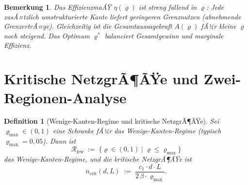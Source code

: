 ﻿\documentclass[12pt, a4paper, openany]{report}
\newtheorem{definition}[theorem]{Definition}
\newtheorem{remark}[theorem]{Bemerkung}
\newcommand{\calR}{\mathcal{R}}
\begin{document}
\begin{remark}
Das EffizienzmaÃŸ $\eta(\varrho)$ ist streng fallend in $\varrho$: Jede
zusÃ¤tzlich umstrukturierte Kante liefert geringeren Grenznutzen (abnehmende
GrenzertrÃ¤ge).  Gleichzeitig ist die Gesamtaussagekraft $A(\varrho)$ fÃ¼r
kleine $\varrho$ noch steigend.  Das Optimum $\varrho^*$ balanciert
Gesamtgewinn und marginale Effizienz.
\end{remark}

\section{Kritische NetzgrÃ¶ÃŸe und Zwei-Regionen-Analyse}
\label{sec:scaling_crit}

\begin{definition}[Wenige-Kanten-Regime und kritische NetzgrÃ¶ÃŸe]
\label{def:few_edges}
Sei $\varrho_{\max} \in (0, 1)$ eine Schranke fÃ¼r das
Wenige-Kanten-Regime (typisch $\varrho_{\max} = 0{,}05$).  Dann ist
\[
  \calR_{\mathrm{few}} \;:=\; \bigl\{\varrho \in (0,1)
  \;\big|\; \varrho \leq \varrho_{\max}\bigr\}
\]
das \emph{Wenige-Kanten-Regime}, und die \emph{kritische NetzgrÃ¶ÃŸe} ist
\begin{equation}
  \label{eq:n_crit}
  n_{\mathrm{crit}}(d, L)
  \;:=\;
  \frac{c_1 \cdot d \cdot L}{2\,\beta \cdot \varrho_{\max}}.
\end{equation}
\end{definition}
\end{document}

